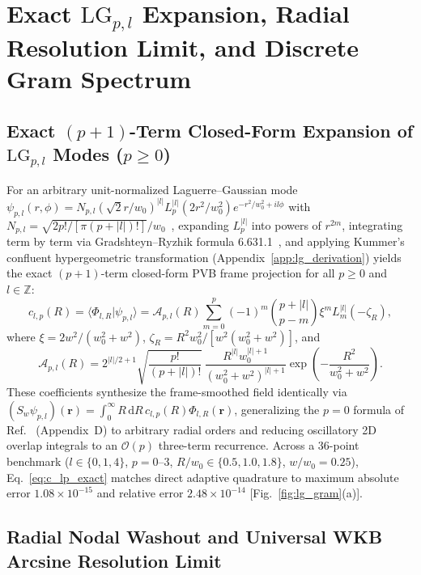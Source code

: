 \documentclass{optica-article}
\newcommand{\braket}[2]{\langle #1 | #2 \rangle}
\newcommand{\abs}[1]{\lvert #1 \rvert}
\newcommand{\dd}{\mathrm{d}}
\begin{document}
\section{Exact $\mathrm{LG}_{p,l}$ Expansion, Radial Resolution Limit, and Discrete Gram Spectrum}
\label{sec:lg_gram}

\subsection{Exact $(p+1)$-Term Closed-Form Expansion of $\mathrm{LG}_{p,l}$ Modes ($p \ge 0$)}

For an arbitrary unit-normalized Laguerre--Gaussian mode $\psi_{p,l}(r,\phi) = N_{p,l}(\sqrt{2}r/w_0)^{\abs{l}}\allowbreak L_p^{\abs{l}}(2r^2/w_0^2)\allowbreak e^{-r^2/w_0^2 + il\phi}$ with $N_{p,l} = \sqrt{2p!/[\pi(p+\abs{l})!]}/w_0$~\cite{Allen1992,Plick2015,Karimi2014}, expanding $L_p^{\abs{l}}$ into powers of $r^{2m}$, integrating term by term via Gradshteyn--Ryzhik formula 6.631.1~\cite{Gradshteyn2014}, and applying Kummer's confluent hypergeometric transformation (Appendix~\ref{app:lg_derivation}) yields the exact $(p+1)$-term closed-form PVB frame projection for all $p \ge 0$ and $l \in \mathbb{Z}$:
\begin{equation}
  c_{l,p}(R) = \braket{\Phi_{l,R}}{\psi_{p,l}} = \mathcal{A}_{p,l}(R)\sum_{m=0}^{p} (-1)^m \binom{p+\abs{l}}{p-m} \xi^m L_m^{\abs{l}}(-\zeta_R),
  \label{eq:c_lp_exact}
\end{equation}
where $\xi = 2w^2/(w_0^2+w^2)$, $\zeta_R = R^2 w_0^2/[w^2(w_0^2+w^2)]$, and
\begin{equation}
  \mathcal{A}_{p,l}(R) = 2^{\abs{l}/2+1}\sqrt{\frac{p!}{(p+\abs{l})!}}\,\frac{R^{\abs{l}} w_0^{\abs{l}+1}}{(w_0^2+w^2)^{\abs{l}+1}}\exp\!\left(-\frac{R^2}{w_0^2+w^2}\right).
  \label{eq:A_pref}
\end{equation}
These coefficients synthesize the frame-smoothed field identically via $(S_w\psi_{p,l})(\mathbf{r}) = \allowbreak \int_0^\infty R\,\dd R\,c_{l,p}(R)\Phi_{l,R}(\mathbf{r})$, generalizing the $p = 0$ formula of Ref.~\cite{Ferreira2026} (Appendix~D) to arbitrary radial orders and reducing oscillatory 2D overlap integrals to an $\mathcal{O}(p)$ three-term recurrence. Across a 36-point benchmark ($l \in \{0,1,4\}$, $p = 0\text{--}3$, $R/w_0 \in \{0.5, 1.0, 1.8\}$, $w/w_0 = 0.25$), Eq.~\eqref{eq:c_lp_exact} matches direct adaptive quadrature to maximum absolute error $1.08\times 10^{-15}$ and relative error $2.48\times 10^{-14}$ [Fig.~\ref{fig:lg_gram}(a)].

\subsection{Radial Nodal Washout and Universal WKB Arcsine Resolution Limit}
\end{document}
